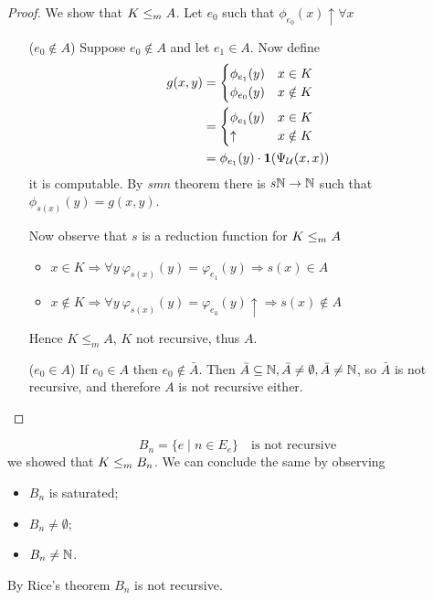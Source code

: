 \begin{proof}
  We show that $ K \leq_m A $. 
  Let $ e_0$ such that $ \phi_{e_0}(x)\uparrow\forall x $
  \begin{itemize}
  \item[($e_0 \notin A$)]
     Suppose
    $ e_0\notin A $ and let $ e_1\in A $.
    Now define
    \begin{align*}
      g(x,y) &= \begin{cases}
        \phi_{e_1}(y) & x \in K \\
        \phi_{e_0}(y) & x \notin K
      \end{cases} \\
      &=
      \begin{cases}
        \phi_{e_1}(y) & x \in K \\
        \uparrow & x \notin K
      \end{cases} \\
      &= \phi_{e_1}(y) \cdot \mathbf{1}(\Psi_{\mathcal{U}}(x,x))
    \end{align*}
    it is computable. By \emph{smn} theorem there is $s \mathbb{N} \to \mathbb{N}$ such that
    $ \phi_{s(x)}(y) = g(x,y)$.

    Now observe that $s$ is a reduction function for $K \leq_m A$
    \begin{itemize}
      \item $x \in K
      \Rightarrow \forall y  \ \varphi_{s(x)}(y) = \varphi_{e_1}(y)
      \Rightarrow s(x) \in A$
      \item $x \notin K
      \Rightarrow \forall y  \ \varphi_{s(x)}(y) = \varphi_{e_0}(y)\uparrow 
      \Rightarrow s(x) \notin A$
    \end{itemize}
    Hence $K \leq_m A$, $K$ not recursive, thus $A$.
    
  \item[($e_0 \in A$)] If $ e_0 \in A $ then $ e_0 \not \in \bar{A}
    $. Then
    $ \bar{A} \subseteq \mathbb{N}, \bar{A} \neq \emptyset, \bar{A} \neq
    \mathbb{N} $, so $ \bar{A} $ is not recursive, and
    therefore $A$ is not recursive either.
  \end{itemize}
\end{proof}

\begin{example}
  \[ B_n = \{e \mid n \in E_e \} \quad \mbox{is not recursive} \]
  we showed that $K \leq_m B_n$. We can conclude the same by observing
  \begin{itemize}
  \item $B_n$ is saturated;
  \item $B_n \neq \emptyset$;
  \item $B_n \neq \mathbb{N}$.
  \end{itemize}
  By Rice's theorem $ B_n $ is not recursive.
\end{example}